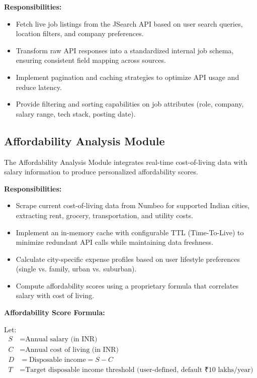 \documentclass[12pt,a4paper,oneside]{report}
\begin{document}
\textbf{Responsibilities:}
\begin{itemize}
    \item Fetch live job listings from the JSearch API based on user search queries, location filters, and company preferences.
    \item Transform raw API responses into a standardized internal job schema, ensuring consistent field mapping across sources.
    \item Implement pagination and caching strategies to optimize API usage and reduce latency.
    \item Provide filtering and sorting capabilities on job attributes (role, company, salary range, tech stack, posting date).
\end{itemize}

\subsection{Affordability Analysis Module}

The Affordability Analysis Module integrates real-time cost-of-living data with salary information to produce personalized affordability scores.

\textbf{Responsibilities:}
\begin{itemize}
    \item Scrape current cost-of-living data from Numbeo for supported Indian cities, extracting rent, grocery, transportation, and utility costs.
    \item Implement an in-memory cache with configurable TTL (Time-To-Live) to minimize redundant API calls while maintaining data freshness.
    \item Calculate city-specific expense profiles based on user lifestyle preferences (single vs. family, urban vs. suburban).
    \item Compute affordability scores using a proprietary formula that correlates salary with cost of living.
\end{itemize}

\textbf{Affordability Score Formula:}

Let:
\begin{align*}
S &= \text{Annual salary (in INR)} \\
C &= \text{Annual cost of living (in INR)} \\
D &= \text{Disposable income} = S - C \\
T &= \text{Target disposable income threshold (user-defined, default ₹10 lakhs/year)}
\end{align*}
\end{document}
